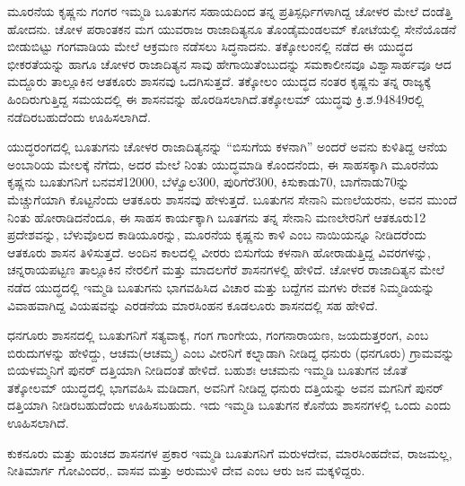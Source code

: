 ಮೂರನೆಯ ಕೃಷ್ಣನು ಗಂಗರ ಇಮ್ಮಡಿ ಬೂತುಗನ ಸಹಾಯದಿಂದ ತನ್ನ ಪ್ರತಿಸ್ಪರ್ಧಿಗಳಾಗಿದ್ದ ಚೋಳರ ಮೇಲೆ ದಂಡೆತ್ತಿ ಹೋದನು. ಚೋಳ ಪರಾಂತಕನ ಮಗ ಯುವರಾಜ ರಾಜಾದಿತ್ಯನೂ ತೊಂಡೈಮಂಡಲಮ್ ಕೋಟೆಯಲ್ಲಿ ಸೇನೆಯೊಡನೆ ಬೀಡುಬಿಟ್ಟು ಗಂಗವಾಡಿಯ ಮೇಲೆ ಆಕ್ರಮಣ ನಡೆಸಲು ಸಿದ್ಧನಾದನು. ತಕ್ಕೋಲಂನಲ್ಲಿ ನಡೆದ ಈ ಯುದ್ಧದ ಭೀಕರತೆಯನ್ನು ಹಾಗೂ ಚೋಳರ ರಾಜಾದಿತ್ಯನ ಸಾವು ಹೇಗಾಯಿತೆಂಬುದನ್ನು ಸಮಕಾಲೀನವೂ ವಿಶ್ವಾಸಾರ್ಹವೂ ಆದ ಮದ್ದೂರು ತಾಲ್ಲೂಕಿನ ಆತಕೂರು ಶಾಸನವು ಒದಗಿಸುತ್ತದೆ. ತಕ್ಕೋಲಂ ಯುದ್ಧದ ನಂತರ ಕೃಷ್ಣನು ತನ್ನ ರಾಜ್ಯಕ್ಕೆ ಹಿಂದಿರುಗುತ್ತಿದ್ದ ಸಮಯದಲ್ಲಿ ಈ ಶಾಸನವನ್ನು ಹೊರಡಿಸಲಾಗಿದೆ.ತಕ್ಕೋಲಮ್ ಯುದ್ಧವು ಕ್ರಿ.ಶ.94849ರಲ್ಲಿ ನಡೆದಿರಬಹುದೆಂದು ಊಹಿಸಲಾಗಿದೆ.

ಯುದ್ಧರಂಗದಲ್ಲಿ ಬೂತುಗನು ಚೋಳರ ರಾಜಾದಿತ್ಯನನ್ನು “ಬಿಸುಗೆಯ ಕಳನಾಗಿ” ಅಂದರೆ ಅವನು ಕುಳಿತಿದ್ದ ಆನೆಯ ಅಂಬಾರಿಯ ಮೇಲಕ್ಕೆ ನೆಗೆದು, ಅದರ ಮೇಲೆ ನಿಂತು ಯುದ್ಧಮಾಡಿ ಕೊಂದನೆಂದು, ಈ ಸಾಹಸಕ್ಕಾಗಿ ಮೂರನೆಯ ಕೃಷ್ಣನು ಬೂತುಗನಿಗೆ ಬನವಸೆ12000, ಬೆಳ್ವೊಲ300, ಪುರಿಗೆರೆ300, ಕಿಸುಕಾಡು70, ಬಾಗೆನಾಡು70ನ್ನು ಮೆಚ್ಚುಗೆಯಾಗಿ ಕೊಟ್ಟನೆಂದು ಆತಕೂರು ಶಾಸನವು ಹೇಳುತ್ತದೆ. ಬೂತುಗನ ಸೇನಾನಿ ಮಣಲೆಯರನು, ಅವನ ಮುಂದೆ ನಿಂತು ಹೋರಾಡಿದನೆಂದೂ, ಈ ಸಾಹಸ ಕಾರ್ಯಕ್ಕಾಗಿ ಬೂತಗನು ತನ್ನ ಸೇನಾನಿ ಮಣಲೇರನಿಗೆ ಆತಕೂರು12 ಪ್ರದೇಶವನ್ನು, ಬೆಳುವೊಲದ ಕಾಡಿಯೂರನ್ನು, ಮೂರನೆಯ ಕೃಷ್ಣನು ಕಾಳಿ ಎಂಬ ನಾಯಿಯನ್ನೂ ನೀಡಿದರೆಂದು ಆತಕೂರು ಶಾಸನ ತಿಳಿಸುತ್ತದೆ. ಅಂದಿನ ಕಾಲದಲ್ಲಿ ವೀರರು ಬಿಸುಗೆಯ ಕಳನಾಗಿ ಹೋರಾಡುತ್ತಿದ್ದ ವಿವರಗಳನ್ನು, ಚನ್ನರಾಯಪಟ್ಟಣ ತಾಲ್ಲೂಕಿನ ನೇರಲಿಗೆ ಮತ್ತು ಮಾದಲಗೆರೆ ಶಾಸನಗಳಲ್ಲಿ ಹೇಳಿದೆ. ಚೋಳರ ರಾಜಾದಿತ್ಯನ ಮೇಲೆ ನಡೆದ ಯುದ್ಧದಲ್ಲಿ ಇಮ್ಮಡಿ ಬೂತುಗನು ಭಾಗವಹಿಸಿದ ವಿಚಾರ ಮತ್ತು ಬದ್ದೆಗನ ಮಗಳು ರೇವಕ ನಿಮ್ಮಡಿಯನ್ನು ವಿವಾಹವಾಗಿದ್ದ ವಿಯಷವನ್ನು ಎರಡನೆಯ ಮಾರಸಿಂಹನ ಕೂಡಲೂರು ಶಾಸನದಲ್ಲಿ ಸಹ ಹೇಳಿದೆ.

ಧನಗೂರು ಶಾಸನದಲ್ಲಿ ಬೂತುಗನಿಗೆ ಸತ್ಯವಾಕ್ಯ, ಗಂಗ ಗಾಂಗೇಯ, ಗಂಗನಾರಾಯಣ, ಜಯದುತ್ತರಂಗ, ಎಂಬ ಬಿರುದುಗಳನ್ನು ಹೇಳಿದ್ದು, ಆಚಮ(ಆಚಮ್ಮ) ಎಂಬ ವೀರನಿಗೆ ಕಲ್ನಾಡಾಗಿ ನೀಡಿದ್ದ ಧನುರು (ಧನಗೂರು) ಗ್ರಾಮವನ್ನು ಬಿಯಳಮ್ಮನಿಗೆ ಪುನರ್​ ದತ್ತಿಯಾಗಿ ನೀಡಿದಂತೆ ಹೇಳಿದೆ. ಬಹುಶಃ ಆಚಮನು ಇಮ್ಮಡಿ ಬೂತುಗನ ಜೊತೆ ತಕ್ಕೋಲಮ್ ಯುದ್ಧದಲ್ಲಿ ಭಾಗವಹಿಸಿ ಮಡಿದಾಗ, ಅವನಿಗೆ ನೀಡಿದ್ದ ಧನುರು ದತ್ತಿಯನ್ನು ಅವನ ಮಗನಿಗೆ ಪುನರ್​ದತ್ತಿಯಾಗಿ ನೀಡಿರಬಹು\-ದೆಂದು ಊಹಿಸಬಹುದು. ಇದು ಇಮ್ಮಡಿ ಬೂತುಗನ ಕೊನೆಯ ಶಾಸನಗಳಲ್ಲಿ ಒಂದು ಎಂದು ಊಹಿಸಲಾಗಿದೆ.

ಕುಕನೂರು ಮತ್ತು ಹುಂಚದ ಶಾಸನಗಳ ಪ್ರಕಾರ ಇಮ್ಮಡಿ ಬೂತುಗನಿಗೆ ಮರುಳದೇವ, ಮಾರಸಿಂಹದೇವ, ರಾಜಮಲ್ಲ, ನೀತಿಮಾರ್ಗ ಗೋವಿಂದರ,. ವಾಸವ ಮತ್ತು ಅರುಮುಳಿ ದೇವ ಎಂಬ ಆರು ಜನ ಮಕ್ಕಳಿದ್ದರು.

